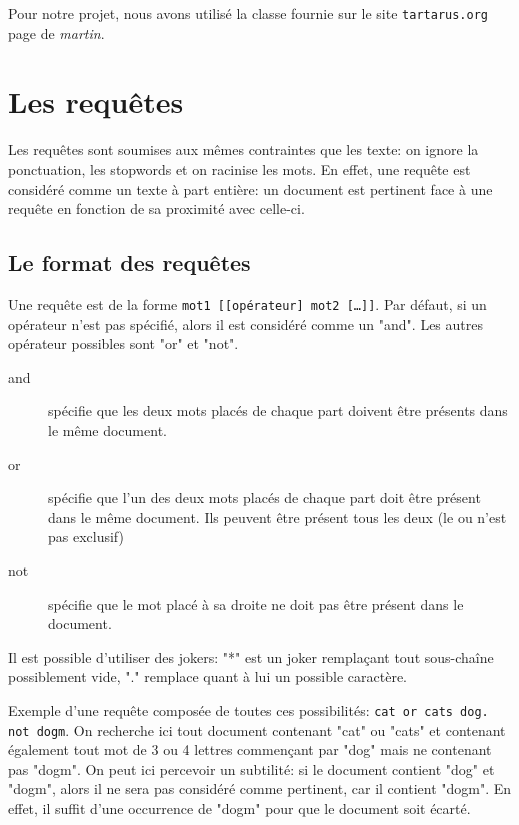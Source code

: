 \documentclass[a4paper,10pt]{article}
\begin{document}
Pour notre projet, nous avons utilis\'e la classe fournie sur le site \texttt{tartarus.org} page de \textit{martin}.

\section{Les requ\^etes}

Les requ\^etes sont soumises aux m\^emes contraintes que les texte: on ignore la ponctuation, les stopwords et on racinise les mots. En effet, une requ\^ete est consid\'er\'e comme un texte \`a part enti\`ere: un document est pertinent face \`a une requ\^ete en fonction de sa proximit\'e avec celle-ci.

\subsection{Le format des requ\^etes}

Une requ\^ete est de la forme \texttt{mot1 \verb?[?\verb?[?op\'erateur\verb?]? mot2 \verb?[?\ldots\verb?]]?}. Par d\'efaut, si un op\'erateur n'est pas sp\'ecifi\'e, alors il est consid\'er\'e comme un "and". Les autres op\'erateur possibles sont "or" et "not". 

\begin{description}
 \item[and] sp\'ecifie que les deux mots plac\'es de chaque part doivent \^etre pr\'esents dans le m\^eme document.
 \item[or] sp\'ecifie que l'un des deux mots plac\'es de chaque part doit \^etre pr\'esent dans le m\^eme document. Ils peuvent \^etre pr\'esent tous les deux (le ou n'est pas exclusif)
 \item[not] sp\'ecifie que le mot plac\'e \`a sa droite ne doit pas \^etre pr\'esent dans le document.
\end{description}

Il est possible d'utiliser des jokers: "*" est un joker rempla\c{c}ant tout sous-chaîne possiblement vide, "." remplace quant \`a lui un possible caract\`ere.

Exemple d'une requ\^ete compos\'ee de toutes ces possibilit\'es: \texttt{cat or cats dog. not dogm}. On recherche ici tout document contenant "cat" ou "cats" et contenant \'egalement tout mot de 3 ou 4 lettres commen\c{c}ant par "dog" mais ne contenant pas "dogm". On peut ici percevoir un subtilit\'e: si le document contient "dog" et "dogm", alors il ne sera pas consid\'er\'e comme pertinent, car il contient "dogm". En effet, il suffit d'une occurrence de "dogm" pour que le document soit \'ecart\'e. 
\end{document}
